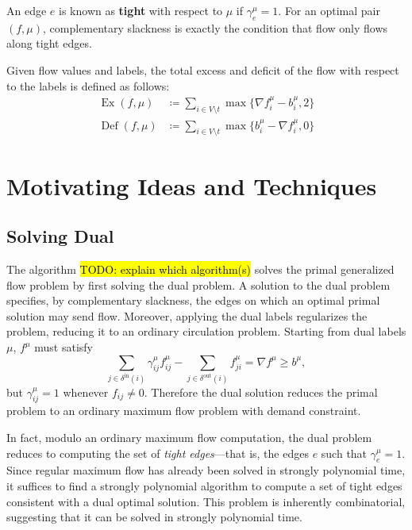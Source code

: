 \documentclass[11pt]{article}
\theoremstyle{definition}
\theoremstyle{definition}
\newcommand{\fu}{f^{\mu}}
\newcommand{\nfiu}{\nabla \fu_i}
\newcommand{\biu}{b_{i}^{\mu}}
\newcommand{\geu}{\gamma_e^{\mu}}
\newcommand{\giij}{\gamma_{ij}^{\mu}}
\newcommand{\din}{\delta^{\text{in}}}
\newcommand{\dout}{\delta^{\text{out}}}
\DeclareMathOperator{\Ex}{Ex}
\DeclareMathOperator{\Def}{Def}
\newcommand{\todo}[1]{\hl{TODO: #1}}
\begin{document}
	An edge $e$ is known as \textbf{tight} with respect to $\mu$ if $\gamma_e^\mu =1$.
	For an optimal pair $(f, \mu)$, complementary slackness is exactly the condition that
	flow only flows along tight edges.
	
	Given flow values and labels, the total excess and deficit of the flow with respect
	to the labels is defined as follows:
	\begin{align*}
	\Ex(f,\mu)  &\coloneqq \sum_{i \in V \setminus t} \max \{ \nfiu - \biu, 2 \} \\
	\Def(f,\mu) &\coloneqq \sum_{i \in V \setminus t} \max \{ \biu - \nfiu, 0 \}
	\end{align*}
  
\section{Motivating Ideas and Techniques}
	\subsection{Solving Dual}
            
	The algorithm \todo{explain which algorithm(s)} solves the primal generalized flow problem by first solving the dual problem.
    A solution to the dual problem specifies, by complementary slackness, the edges on which an optimal
    primal solution may send flow. Moreover, applying the dual labels regularizes the problem, reducing
    it to an ordinary circulation problem. Starting from dual labels $\mu$, $f^{\mu}$ must satisfy
    \[ \sum_{j \in \din(i)} \giij \fu_{ij} - \sum_{j \in \dout(i)} \fu_{ji}
     = \nabla f^{\mu} \geq b^{\mu}, \]
    but $\giij = 1$ whenever $f_{ij} \neq 0$. Therefore the dual solution reduces the primal problem
    to an ordinary maximum flow problem with demand constraint.
    
    In fact, modulo an ordinary maximum flow computation, the dual problem reduces to computing
    the set of \emph{tight edges}---that is, the edges $e$ such that $\geu = 1$. Since regular maximum
    flow has already been solved in strongly polynomial time, it suffices to find a strongly polynomial
    algorithm to compute a set of tight edges consistent with a dual optimal solution. This problem
    is inherently combinatorial, suggesting that it can be solved in strongly polynomial time.
    
\end{document}
